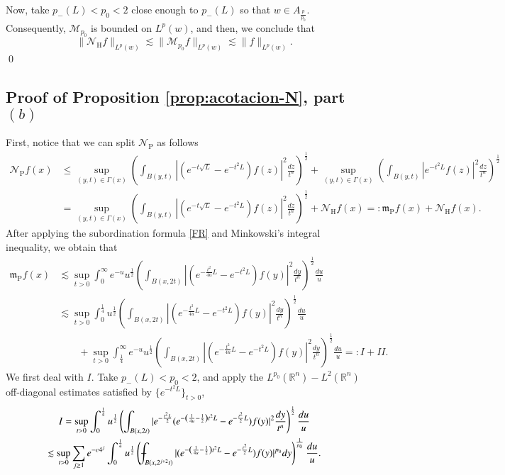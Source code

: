 \documentclass[11pt, a4paper,leqno]{amsart}
\def\Xint#1{\mathchoice
    {\XXint\displaystyle\textstyle{#1}}%
    {\XXint\textstyle\scriptstyle{#1}}%
    {\XXint\scriptstyle\scriptscriptstyle{#1}}%
    {\XXint\scriptscriptstyle\scriptscriptstyle{#1}}%
    \!\int}
\def\XXint#1#2#3{{\setbox0=\hbox{$#1{#2#3}{\int}$}
    \vcenter{\hbox{$#2#3$}}\kern-.5\wd0}}
\def\dashint{\Xint-}
\def\Xint#1{\mathchoice
    {\XXint\displaystyle\textstyle{#1}}%
    {\XXint\textstyle\scriptstyle{#1}}%
    {\XXint\scriptstyle\scriptscriptstyle{#1}}%
    {\XXint\scriptscriptstyle\scriptscriptstyle{#1}}%
    \!\int}
\def\XXint#1#2#3{{\setbox0=\hbox{$#1{#2#3}{\int}$}
    \vcenter{\hbox{$#2#3$}}\kern-.5\wd0}}
\theoremstyle{plain}
\theoremstyle{definition}
\theoremstyle{remark}
\numberwithin{equation}{section}
\def \R{ \mathbb{R} }
\def \hh{ \mathrm{H} }
\def \pp{ \mathrm{P} }
\def \Ncal { \mathcal{N} }
\begin{document}
Now, take $p_-(L)<p_0<2$ close enough to $p_-(L)$ so that
$w\in A_{\frac{p}{p_0}}$. Consequently, $\mathcal{M}_{p_0}$ is bounded on
$L^p(w)$, and then, we conclude that
$$
    \|\Ncal_{\hh}f\|_{L^p(w)}\lesssim \|\mathcal{M}_{p_0}f\|_{L^p(w)}
    \lesssim \|f\|_{L^p(w)}.
 $$
\qed
\subsection{Proof of Proposition \ref{prop:acotacion-N}, part $(b)$}
First, notice that we can split $\Ncal_{\pp}$ as follows
\begin{align*}
\Ncal_{\pp}f(x)&\leq \sup_{(y,t)\in \Gamma(x)} \left(\int_{B(y,t)}|(e^{-t\sqrt{L}}-e^{-t^2L})f(z)|^2\frac{dz}{t^n}\right)^{\frac{1}{2}}+
\sup_{(y,t)\in \Gamma(x)} \left(\int_{B(y,t)}|e^{-t^2L}f(z)|^2\frac{dz}{t^n}\right)^{\frac{1}{2}}
\\&
=
\sup_{(y,t)\in \Gamma(x)} \left(\int_{B(y,t)}|(e^{-t\sqrt{L}}-e^{-t^2L})f(z)|^2\frac{dz}{t^n}\right)^{\frac{1}{2}}+\Ncal_{\hh}f(x)
=: \mathfrak{m}_{\pp}f(x)+\mathcal{N}_{\hh}f(x).
\end{align*}
After applying the subordination formula \eqref{FR} and Minkowski's integral inequality, we obtain that
\begin{align*}
\mathfrak{m}_{\pp}f(x)&\lesssim\sup_{t>0} \int_{0}^{\infty}e^{-u}u^{\frac{1}{2}}\left(\int_{B(x,2t)}|(e^{-\frac{t^2}{4u}L}-e^{-t^2L})f(y)|^2\frac{dy}{t^n}\right)^{\frac{1}{2}}\frac{du}{u}
\\&
\lesssim\sup_{t>0} \int_{0}^{\frac{1}{4}}u^{\frac{1}{2}}\left(\int_{B(x,2t)}|(e^{-\frac{t^2}{4u}L}-e^{-t^2L})f(y)|^2\frac{dy}{t^n}\right)^{\frac{1}{2}}\frac{du}{u}
\\&\qquad
+
\sup_{t>0} \int_{\frac{1}{4}}^{\infty}e^{-u}u^{\frac{1}{2}}\left(\int_{B(x,2t)}|(e^{-\frac{t^2}{4u}L}-e^{-t^2L})f(y)|^2\frac{dy}{t^n}\right)^{\frac{1}{2}}\frac{du}{u}=:I+II.
\end{align*}
We first deal with $I$. Take $p_-(L)<p_0<2$, and
apply the $L^{p_0}(\R^n)-L^2(\R^n)$ off-diagonal estimates satisfied by  $\{e^{-t^2L}\}_{t>0}$,
\begin{multline*}
I=\sup_{t>0} \int_{0}^{\frac{1}{4}}u^{\frac{1}{2}}\left(\int_{B(x,2t)}|e^{-\frac{t^2L}{2}}(e^{-\left(\frac{1}{4u}-\frac{1}{2}\right)t^2L}-e^{-\frac{t^2}{2}L})f(y)|^2\frac{dy}{t^n}\right)^{\frac{1}{2}}\frac{du}{u}
\\
\lesssim
\sup_{t>0} \sum_{j\geq 1}e^{-c4^j}\int_{0}^{\frac{1}{4}}u^{\frac{1}{2}}\left(\dashint_{B(x,2^{j+2}t)}|(e^{-\left(\frac{1}{4u}-\frac{1}{2}\right)t^2L}-e^{-\frac{t^2}{2}L})f(y)|^{p_0}dy\right)^{\frac{1}{p_0}}\frac{du}{u}.
\end{multline*}
\end{document}
